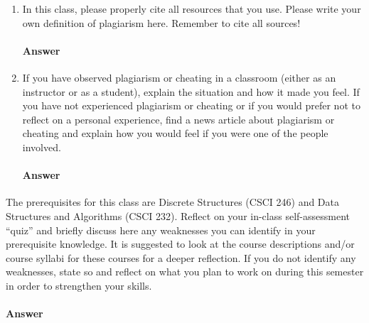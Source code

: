 \documentclass{article}
\begin{document}
\collab{\todo{}}

\begin{enumerate}

    \item In this class, please properly cite all resources that you use. Please
        write your own definition of plagiarism here.  Remember to cite all
        sources!

        \paragraph{Answer}
        \todo{}

    \item If you have observed plagiarism or cheating in a classroom (either as
        an instructor or as a student), explain the situation and how it made
        you feel.  If you have not experienced plagiarism or cheating or if you
        would prefer not to reflect on a personal experience, find a news
        article about plagiarism or cheating and explain how you would feel if
        you were one of the people involved.

        \paragraph{Answer}
        \todo{}
\end{enumerate}



The prerequisites for this class are Discrete Structures (CSCI 246) and Data
Structures and Algorithms (CSCI 232). Reflect on your in-class self-assessment
``quiz'' and briefly discuss here any weaknesses you can identify in your
prerequisite knowledge.  It is suggested to look at the course descriptions
and/or course syllabi for these courses for a deeper reflection. If you do not
identify any weaknesses, state so and reflect on what you plan to work on during
this semester in order to strengthen your skills.

\paragraph{Answer}

\todo{}
\end{document}
